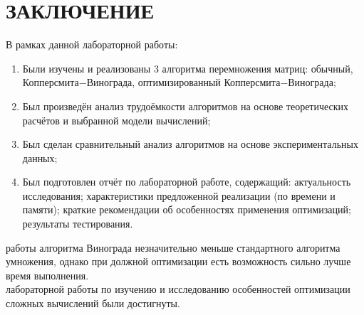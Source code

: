 \chapter*{ЗАКЛЮЧЕНИЕ}

В рамках данной лабораторной работы:

\begin{enumerate}
    \item Были изучены и реализованы 3 алгоритма перемножения матриц: обычный, Копперсмита$-$Винограда, оптимизированный Копперсмита$-$Винограда;
    \item Был произведён анализ трудоёмкости алгоритмов на основе теоретических расчётов и выбранной модели вычислений;
    \item Был сделан сравнительный анализ алгоритмов на основе экспериментальных данных;
    \item Был подготовлен отчёт по лабораторной работе, содержащий: актуальность исследования; характеристики предложенной реализации (по времени и памяти);
    краткие рекомендации об особенностях применения оптимизаций;
    результаты тестирования.
\end{enumerate}
\indent{} работы алгоритма Винограда незначительно меньше стандартного алгоритма умножения, однако при должной оптимизации есть возможность сильно лучше время выполнения.
\\
 лабораторной работы по изучению и исследованию особенностей оптимизации сложных вычислений были достигнуты.